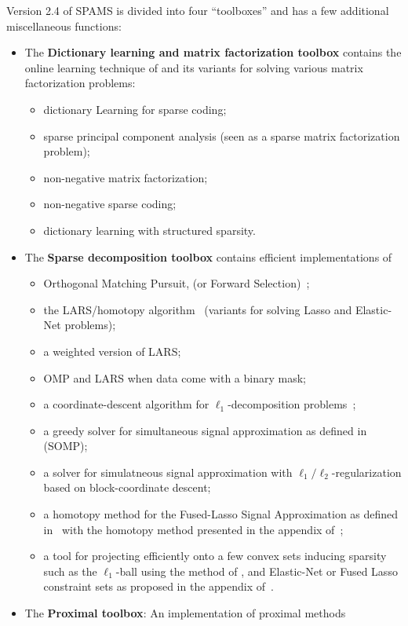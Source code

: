 \documentclass[a4paper, 11pt]{article}
\begin{document}
Version 2.4 of SPAMS is divided into four ``toolboxes'' and has a few
additional miscellaneous functions:
\begin{itemize}
\item The \textbf{Dictionary learning and matrix factorization toolbox}
contains the online learning technique of \cite{mairal7,mairal9} and its
variants for solving various matrix factorization problems:
\begin{itemize}
\item dictionary Learning for sparse coding;
\item sparse principal component analysis (seen as a sparse matrix factorization problem);
\item non-negative matrix factorization;
\item non-negative sparse coding;
\item dictionary learning with structured sparsity.
\end{itemize}
\item The \textbf{Sparse decomposition toolbox} contains efficient implementations of
\begin{itemize}
\item Orthogonal Matching Pursuit, (or Forward Selection)~\cite{weisberg,mallat4};
\item the LARS/homotopy algorithm~\cite{osborne,efron} (variants for solving Lasso and Elastic-Net problems);
\item a weighted version of LARS; 
\item OMP and LARS when data come with a binary mask;
\item a coordinate-descent algorithm for $\ell_1$-decomposition problems~\cite{fu,friedman,wu}; 
\item a greedy solver for simultaneous signal approximation as defined in~\cite{tropp2,tropp3} (SOMP);
\item a solver for simulatneous signal approximation with $\ell_1/\ell_2$-regularization based on block-coordinate descent;
\item a homotopy method for the Fused-Lasso Signal Approximation as defined in~\cite{friedman} with the homotopy method presented in the appendix of~\cite{mairal9};
\item a tool for projecting efficiently onto a few convex sets
inducing sparsity such as the $\ell_1$-ball using the method of
\cite{brucker,maculan,duchi}, and Elastic-Net or Fused Lasso constraint sets as
proposed in the appendix of~\cite{mairal9}.
\end{itemize}
\item The \textbf{Proximal toolbox}: An implementation of proximal methods

\end{itemize}
\end{document}
